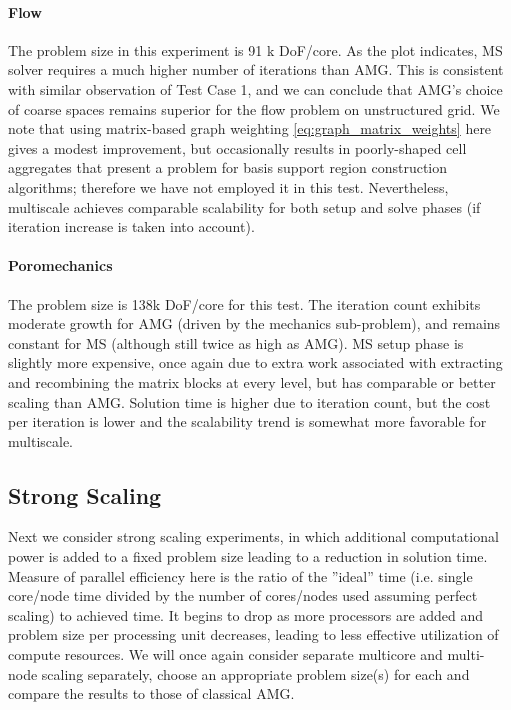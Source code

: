 \paragraph{Flow}
The problem size in this experiment is 91 k DoF/core.   As the plot indicates, MS solver requires a much higher number of iterations than AMG.   This is consistent with similar observation of Test Case 1, and we can conclude that AMG's choice of coarse spaces remains superior for the flow problem on unstructured grid.   We note that using matrix-based graph weighting \cref{eq:graph_matrix_weights} here gives a modest improvement, but occasionally results in poorly-shaped cell aggregates that present a problem for basis support region construction algorithms; therefore we have not employed it in this test.   Nevertheless, multiscale achieves comparable scalability for both setup and solve phases (if iteration increase is taken into account).

\paragraph{Poromechanics}
The problem size is 138k DoF/core for this test.   The iteration count exhibits moderate growth for AMG (driven by the mechanics sub-problem), and remains constant for MS (although still twice as high as AMG).   MS setup phase is slightly more expensive, once again due to extra work associated with extracting and recombining the matrix blocks at every level, but has comparable or better scaling than AMG.   Solution time is higher due to iteration count, but the cost per iteration is lower and the scalability trend is somewhat more favorable for multiscale.

\subsection{Strong Scaling}
\label{subsec:par_scaling_strong}

Next we consider strong scaling experiments, in which additional computational power is added to a fixed problem size leading to a reduction in solution time.   Measure of parallel efficiency here is the ratio of the ''ideal'' time (i.e. single core/node time divided by the number of cores/nodes used assuming perfect scaling) to achieved time.   It begins to drop as more processors are added and problem size per processing unit decreases, leading to less effective utilization of compute resources.    We will once again consider separate multicore and multi-node scaling separately, choose an appropriate problem size(s) for each and compare the results to those of classical AMG.

